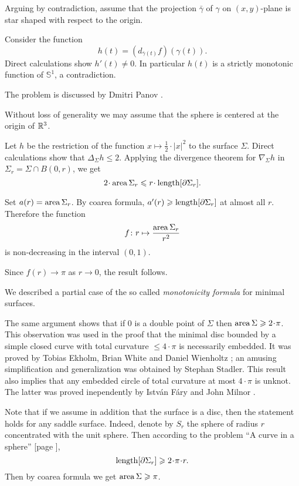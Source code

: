 Arguing by contradiction, assume that the projection $\bar\gamma$
of $\gamma$ on $(x, y)$-plane is star shaped with respect to the origin.

Consider the function 
$$h(t)=(d_{\bar\gamma(t)}f)(\gamma(t)).$$
Direct calculations show $h'(t)\ne 0$.
In particular $h(t)$ is a strictly monotonic function of $\mathbb{S}^1$, a contradiction.\qeds

The problem is discussed by Dmitri Panov \cite[see][]{panov-curves}.

Without loss of generality we may assume that the sphere is centered at the origin of $\mathbb{R}^3$.

Let $h$ be the restriction of the function $x\mapsto \tfrac12\cdot|x|^2$ to the surface $\Sigma$.
Direct calculations show that $\Delta_\Sigma h\le 2$.
Applying the divergence theorem for $\nabla_\Sigma h$
in $\Sigma_r=\Sigma\cap B(0,r)$, we get
\[2\cdot \area\Sigma_r\le r\cdot\length [\partial\Sigma_r].\]

Set $a(r)=\operatorname{\rm area}\nolimits\Sigma_r$.
By coarea formula, $a'(r)\geqslant\operatorname{\rm length} [\partial\Sigma_r]$ at almost all $r$.
Therefore the function
\[f\colon r\mapsto \frac{\operatorname{\rm area}\nolimits\Sigma_r}{r^2}
\]
is non-decreasing in the interval $(0,1)$.

Since $f(r)\to \pi$ as $r\to0$, the result follows.\qeds

We described a partial case of the so called \emph{monotonicity formula} for minimal surfaces.

The same argument shows that if $0$ is a double point
of $\Sigma$ then $\area\Sigma\ge 2\cdot \pi$.
This observation was used in the proof 
that the minimal disc bounded by a simple closed curve with total curvature $\le 4\cdot\pi$ 
is necessarily embedded.
It was proved by 
Tobias Ekholm, 
Brian White 
and Daniel Wienholtz
\cite[see][]{EWW};
an amusing simplification and generalization
was obtained by 
Stephan Stadler. %
This result also implies that any embedded circle of total curvature at most $4\cdot\pi$ is unknot.
The latter was proved inependently by Istv{\'a}n F{\'a}ry \cite[see][]{fary-knot} and  John Milnor \cite[see][]{milnor}.

Note that if we assume in addition that the surface is a disc,
then the statement holds for any saddle surface. 
Indeed, denote by $S_r$ the sphere of radius $r$ concentrated with the unit sphere. 
Then according to the problem ``A curve in a sphere'' [page \pageref{A curve in a sphere}], 
\[\length[\partial\Sigma_r]\ge 2\cdot\pi\cdot r.\]
Then by coarea formula we get $\operatorname{\rm area}\nolimits\Sigma\geqslant \pi$.

